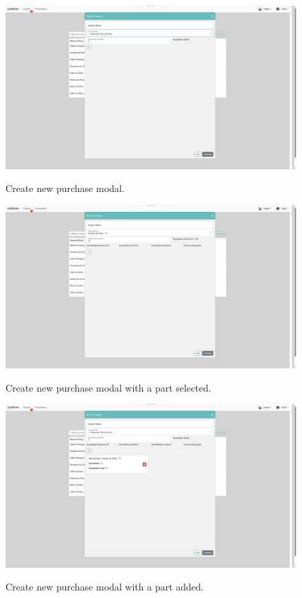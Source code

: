 \begin{figure}[h]
  \caption{Create new purchase modal.}
  \centering
  \includegraphics[width=\textwidth]{figs/Implementation/warehouse/createPurchase}
  \label{fig:createPurchase}
\end{figure}

\begin{figure}[h]
  \caption{Create new purchase modal with a part selected.}
  \centering
  \includegraphics[width=\textwidth]{figs/Implementation/warehouse/createPurchaseWithParts}
  \label{fig:createPurchaseWithParts}
\end{figure}

\begin{figure}[h]
  \caption{Create new purchase modal with a part added.}
  \centering
  \includegraphics[width=\textwidth]{figs/Implementation/warehouse/createPurchaseAddedPart}
  \label{fig:createPurchaseAddedPart}
\end{figure}

